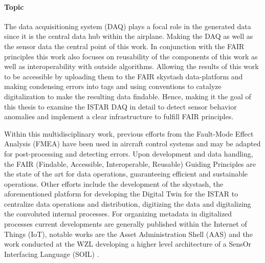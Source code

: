 \paragraph{Topic}

The data acquisitioning system (DAQ) plays a focal role in the generated data since it is the central data hub within the airplane. Making the DAQ as well as the sensor data the central point of this work.
In conjunction with the FAIR principles this work also focuses on reusability of the components of this work as well as interoperability with outside algorithms. Allowing the results of this work to be accessible by uploading them to the FAIR skystash data-platform and making condensing errors into tags and using conventions to catalyze digitalization to make the resulting data findable.
Hence, making it the goal of this thesis to examine the ISTAR DAQ in detail to detect sensor behavior anomalies and implement a clear infrastructure to fulfill FAIR principles.




Within this multidisciplinary work, previous efforts from the Fault-Mode Effect Analysis (FMEA) \cite{isermann_fault-diagnosis_2006} have been used in aircraft control systems and may be adapted for post-processing and detecting errors. Upon development and data handling, the FAIR (Findable, Accessible, Interoperable, Reusable) Guiding Principles \cite{wilkinson_fair_2016} are the state of the art for data operations, guaranteeing efficient and sustainable operations.
Other efforts include the development of the skystash, the aforementioned platform for developing the Digital Twin \cite{meyer_development_2020, arts_digital_2022} for the ISTAR to centralize data operations and distribution, digitizing the data and digitalizing the convoluted internal processes.
For organizing metadata in digitalized processes current developments are generally published within the Internet of Things (IoT), notable works are the Asset Administration Shell (AAS) \cite{bader_details_2020} and the work conducted at the WZL developing a higher level architecture of a SensOr Interfacing Language (SOIL) \cite{behrens_domain-specific_2021}.


